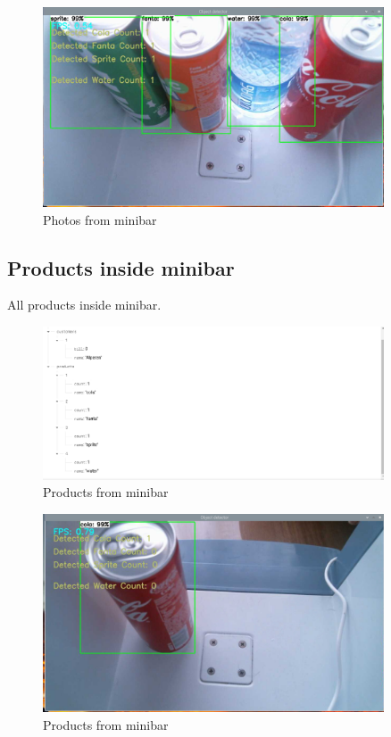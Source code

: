 \begin{figure}[!htbp]
    \centering
    \includegraphics[width=0.9\textwidth]{Imgs/rapor4.PNG}
    \caption{\label{fig:minibar}Photos from minibar}
\end{figure}

\subsection{Products inside minibar}
All products inside minibar.
\begin{figure}[!htbp]
    \centering
    \includegraphics[width=0.9\textwidth]{Imgs/beforetaking cola.PNG}
    \caption{\label{fig:products in minibar}Products from minibar}
\end{figure}

\begin{figure}[!htbp]
    \centering
    \includegraphics[width=0.9\textwidth]{Imgs/only cola.PNG}
    \caption{\label{fig:products in minibar}Products from minibar}
\end{figure}


